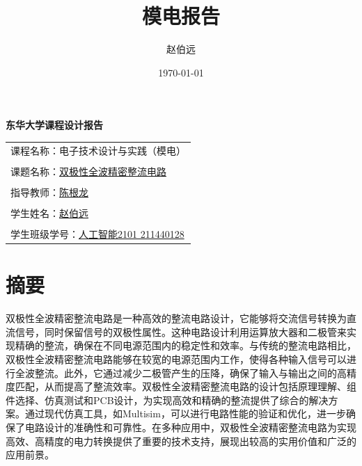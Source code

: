 \documentclass[UTF8,titlepage,a4paper]{ctexart}
\numberwithin{figure}{section}
\begin{document}
\title{模电报告}
\author{赵伯远}
\date{\today}
\thispagestyle{empty}
\begin{center}
{\fontsize{30pt}{21pt}\selectfont \textbf{东华大学课程设计报告}}

\vspace{10cm}

\begin{tabular}{l}
    {\large 课程名称：电子技术设计与实践（模电）} \\
    \\
    \large{课题名称：\underline{\hspace{22pt}双极性全波精密整流电路\hspace{22pt}}}  \\
    \\
    \large{指导教师：\underline{\hspace{70pt}陈根龙\hspace{70pt}}} \\
    \\
    \large{学生姓名：\underline{\hspace{70pt}赵伯远\hspace{70pt}}} \\
    \\
    \large{学生班级学号：\underline{\hspace{11pt}人工智能2101 211440128\hspace{11pt}}} \\
    \end{tabular}
\end{center}
\clearpage
\setcounter{page}{1}
\tableofcontents
\clearpage
\section{摘要}
双极性全波精密整流电路是一种高效的整流电路设计，它能够将交流信号转换为直流信号，同时保留信号的双极性属性。这种电路设计利用运算放大器和二极管来实现精确的整流，确保在不同电源范围内的稳定性和效率。与传统的整流电路相比，双极性全波精密整流电路能够在较宽的电源范围内工作，使得各种输入信号可以进行全波整流\cite{ti}。此外，它通过减少二极管产生的压降，确保了输入与输出之间的高精度匹配，从而提高了整流效率。双极性全波精密整流电路的设计包括原理理解、组件选择、仿真测试和PCB设计，为实现高效和精确的整流提供了综合的解决方案\cite{ti}。通过现代仿真工具，如Multisim，可以进行电路性能的验证和优化，进一步确保了电路设计的准确性和可靠性\cite{csdn}。在多种应用中，双极性全波精密整流电路为实现高效、高精度的电力转换提供了重要的技术支持，展现出较高的实用价值和广泛的应用前景。
\end{document}
